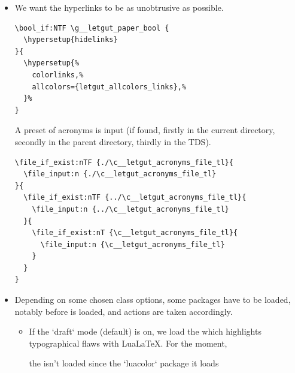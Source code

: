 \documentclass{letgut}
\begin{document}
\begin{itemize}
\item We want the hyperlinks to be as unobtrusive as possible.
\begin{lstlisting}
\bool_if:NTF \g__letgut_paper_bool {
  \hypersetup{hidelinks}
}{
  \hypersetup{%
    colorlinks,%
    allcolors={letgut_allcolors_links},%
  }%
}
\end{lstlisting}

A preset of acronyms is input (if found, firstly in the current directory,
secondly in the parent directory, thirdly in the TDS).
\begin{lstlisting}
\file_if_exist:nTF {./\c__letgut_acronyms_file_tl}{
  \file_input:n {./\c__letgut_acronyms_file_tl}
}{
  \file_if_exist:nTF {../\c__letgut_acronyms_file_tl}{
    \file_input:n {../\c__letgut_acronyms_file_tl}
  }{
    \file_if_exist:nT {\c__letgut_acronyms_file_tl}{
      \file_input:n {\c__letgut_acronyms_file_tl}
    }
  }
}
\end{lstlisting}

\item Depending on some chosen class options, some packages have to be loaded,
notably before  is loaded, and actions are taken
accordingly.
\begin{itemize}
\item If the `draft` mode (default) is on, we load the  which
highlights typographical flaws with LuaLaTeX. For the moment,

the  isn't loaded since  the `luacolor`
package it loads


\end{itemize}
\end{itemize}
\end{document}
